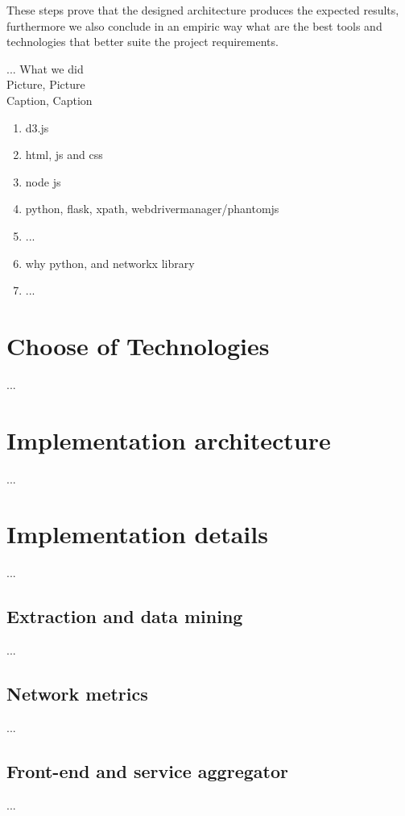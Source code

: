 These steps prove that the designed architecture produces the expected results, furthermore we also conclude in an empiric way what are
the best tools and technologies that better suite the project requirements.

... What we did\\
Picture, Picture\\
Caption, Caption\\

\begin{enumerate}
    \item d3.js
    \item html, js and css
    \item node js
    \item python, flask, xpath, webdrivermanager/phantomjs
    \item ...
    \item why python, and networkx library
    \item ...
\end{enumerate}

\section{Choose of Technologies}
...
\section{Implementation architecture}
...
\section{Implementation details}
...
\subsection{Extraction and data mining}
...
\subsection{Network metrics}
...
\subsection{Front-end and service aggregator}
...
